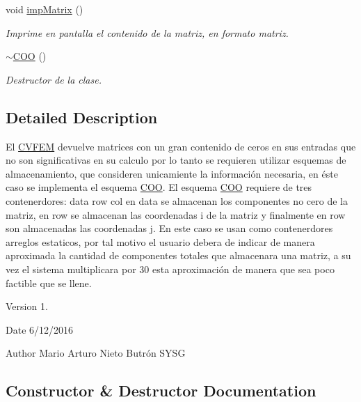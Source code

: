 \begin{DoxyCompactItemize}
void \hyperlink{class_c_o_o_a33a3d395ce41eef9d071615df01d721f}{imp\+Matrix} ()
\begin{DoxyCompactList}\small\item\em Imprime en pantalla el contenido de la matriz, en formato matriz. \end{DoxyCompactList}\item 
\hypertarget{class_c_o_o_aa86af3bc5b93a8978e4fc35531486214}{}\label{class_c_o_o_aa86af3bc5b93a8978e4fc35531486214} 
\hyperlink{class_c_o_o_aa86af3bc5b93a8978e4fc35531486214}{$\sim$\+C\+OO} ()
\begin{DoxyCompactList}\small\item\em Destructor de la clase. \end{DoxyCompactList}\end{DoxyCompactItemize}


\subsection{Detailed Description}
El \hyperlink{class_c_v_f_e_m}{C\+V\+F\+EM} devuelve matrices con un gran contenido de ceros en sus entradas que no son significativas en su calculo por lo tanto se requieren utilizar esquemas de almacenamiento, que consideren unicamiente la información necesaria, en éste caso se implementa el esquema \hyperlink{class_c_o_o}{C\+OO}. El esquema \hyperlink{class_c_o_o}{C\+OO} requiere de tres contenerdores\+: data row col en data se almacenan los componentes no cero de la matriz, en row se almacenan las coordenadas i de la matriz y finalmente en row son almacenadas las coordenadas j. En este caso se usan como contenerdores arreglos estaticos, por tal motivo el usuario debera de indicar de manera aproximada la cantidad de componentes totales que almacenara una matriz, a su vez el sistema multiplicara por 30 esta aproximación de manera que sea poco factible que se llene. 

\begin{DoxyVersion}{Version}
1. 
\end{DoxyVersion}
\begin{DoxyDate}{Date}
6/12/2016 
\end{DoxyDate}
\begin{DoxyAuthor}{Author}
Mario Arturo Nieto Butrón  S\+Y\+SG 
\end{DoxyAuthor}


\subsection{Constructor \& Destructor Documentation}
\hypertarget{class_c_o_o_a0a3f4384fb7f86ca45f54035c6cd51e2}{}\label{class_c_o_o_a0a3f4384fb7f86ca45f54035c6cd51e2} 
